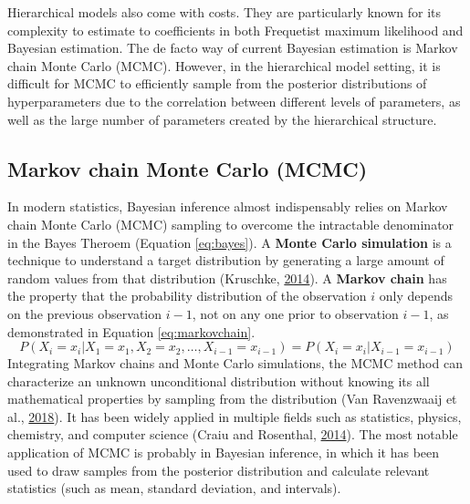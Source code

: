 \documentclass[12pt]{book}
\numberwithin{equation}{chapter}
\begin{document}
Hierarchical models also come with costs. They are particularly known for its complexity to estimate to coefficients in both Frequetist maximum likelihood and Bayesian estimation. The de facto way of current Bayesian estimation is Markov chain Monte Carlo (MCMC). However, in the hierarchical model setting, it is difficult for MCMC to efficiently sample from the posterior distributions of hyperparameters due to the correlation between different levels of parameters, as well as the large number of parameters created by the hierarchical structure.

\hypertarget{markov-chain-monte-carlo-mcmc}{%
\subsection{Markov chain Monte Carlo (MCMC)}\label{markov-chain-monte-carlo-mcmc}}

In modern statistics, Bayesian inference almost indispensably relies on Markov chain Monte Carlo (MCMC) sampling to overcome the intractable denominator in the Bayes Theroem (Equation \eqref{eq:bayes}). A \textbf{Monte Carlo simulation} is a technique to understand a target distribution by generating a large amount of random values from that distribution (Kruschke, \protect\hyperlink{ref-kruschke2014doing}{2014}). A \textbf{Markov chain} has the property that the probability distribution of the observation \(i\) only depends on the previous observation \(i-1\), not on any one prior to observation \(i-1\), as demonstrated in Equation \eqref{eq:markovchain}.
\begin{equation}
P\left(X_{i}=x_{i} | X_{1}=x_{1}, X_{2}=x_{2}, \ldots, X_{i-1}=x_{i-1}\right) = P\left(X_{i}=x_{i} | X_{i-1}=x_{i-1}\right)
\label{eq:markovchain}
\end{equation}
Integrating Markov chains and Monte Carlo simulations, the MCMC method can characterize an unknown unconditional distribution without knowing its all mathematical properties by sampling from the distribution (Van Ravenzwaaij et al., \protect\hyperlink{ref-van2018simple}{2018}). It has been widely applied in multiple fields such as statistics, physics, chemistry, and computer science (Craiu and Rosenthal, \protect\hyperlink{ref-craiu2014bayesian}{2014}). The most notable application of MCMC is probably in Bayesian inference, in which it has been used to draw samples from the posterior distribution and calculate relevant statistics (such as mean, standard deviation, and intervals).
\end{document}
